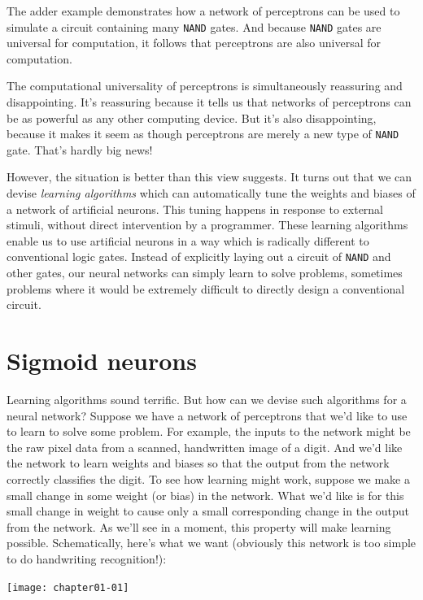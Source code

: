 The adder example demonstrates how a network of perceptrons can be used to simulate a circuit containing many \lstinline{NAND} gates. And because \lstinline{NAND} gates are universal for computation, it follows that perceptrons are also universal for computation.

The computational universality of perceptrons is simultaneously reassuring and disappointing. It's reassuring because it tells us that networks of perceptrons can be as powerful as any other computing device. But it's also disappointing, because it makes it seem as though perceptrons are merely a new type of \lstinline{NAND} gate. That's hardly big news!

However, the situation is better than this view suggests. It turns out that we can devise \textit{learning algorithms} which can automatically tune the weights and biases of a network of artificial neurons. This tuning happens in response to external stimuli, without direct intervention by a programmer. These learning algorithms enable us to use artificial neurons in a way which is radically different to conventional logic gates. Instead of explicitly laying out a circuit of \lstinline{NAND} and other gates, our neural networks can simply learn to solve problems, sometimes problems where it would be extremely difficult to directly design a conventional circuit.

\section{Sigmoid neurons}

Learning algorithms sound terrific. But how can we devise such algorithms for a neural network? Suppose we have a network of perceptrons that we'd like to use to learn to solve some problem. For example, the inputs to the network might be the raw pixel data from a scanned, handwritten image of a digit. And we'd like the network to learn weights and biases so that the output from the network correctly classifies the digit. To see how learning might work, suppose we make a small change in some weight (or bias) in the network. What we'd like is for this small change in weight to cause only a small corresponding change in the output from the network. As we'll see in a moment, this property will make learning possible. Schematically, here's what we want (obviously this network is too simple to do handwriting recognition!):

\begin{marginfigure}
\texttt{[image: chapter01-01]}
\end{marginfigure}


